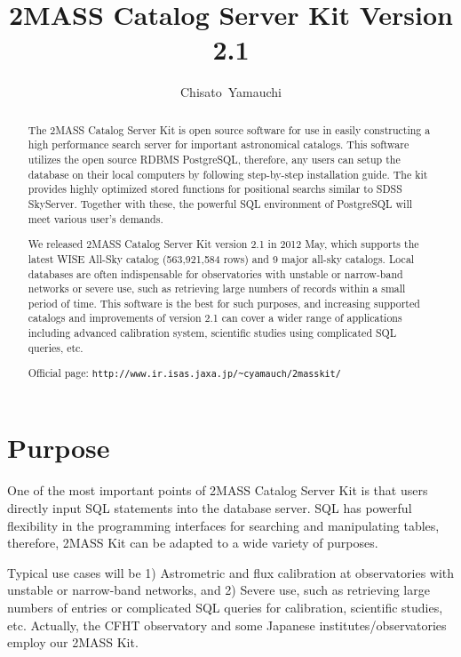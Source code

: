 
\resetcounters




\title{2MASS Catalog Server Kit Version 2.1}
\author{Chisato~Yamauchi
}


\begin{abstract}
The 2MASS Catalog Server Kit is open source software for use in easily constructing a high performance search server for important astronomical catalogs. This software utilizes the open source RDBMS PostgreSQL, therefore, any users can setup the database on their local computers by following step-by-step installation guide. The kit provides highly optimized stored functions for positional searchs similar to SDSS SkyServer. Together with these, the powerful SQL environment of PostgreSQL will meet various user's demands.

We released 2MASS Catalog Server Kit version 2.1 in 2012 May, which supports the latest WISE All-Sky catalog (563,921,584 rows) and 9 major all-sky catalogs. Local databases are often indispensable for observatories with unstable or narrow-band networks or severe use, such as retrieving large numbers of records within a small period of time. This software is the best for such purposes, and increasing supported catalogs and improvements of version 2.1 can cover a wider range of applications including advanced calibration system, scientific studies using complicated SQL queries, etc.

Official page: {\tt http://www.ir.isas.jaxa.jp/\~{}cyamauch/2masskit/}
\end{abstract}


\section{Purpose}

One of the most important points of 2MASS Catalog Server Kit \citep{yam_2011a} is that users directly input SQL statements into the database server. SQL has powerful flexibility in the programming interfaces for searching and manipulating tables, therefore, 2MASS Kit can be adapted to a wide variety of purposes.

Typical use cases will be 1) Astrometric and flux calibration at observatories with unstable or narrow-band networks, and 2) Severe use, such as retrieving large numbers of entries or complicated SQL queries for calibration, scientific studies, etc. Actually, the CFHT observatory and some Japanese institutes/observatories employ our 2MASS Kit. 

